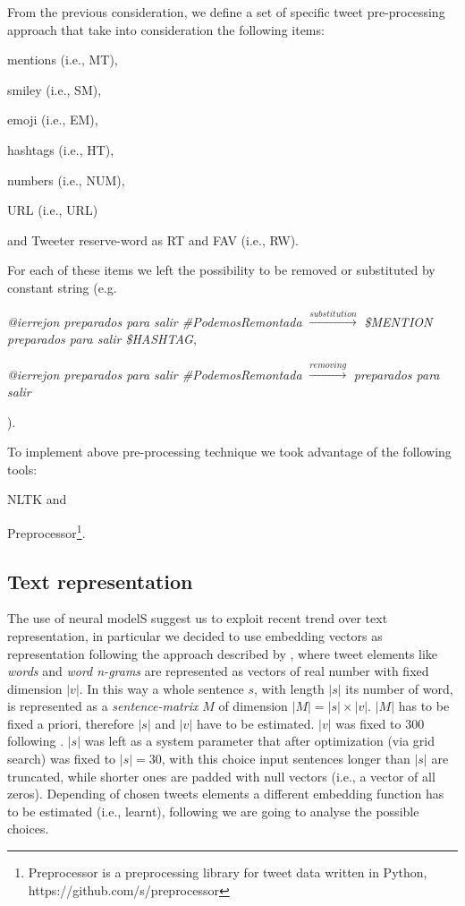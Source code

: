 From the previous consideration, we define a set of specific tweet pre-processing approach that take into consideration the following items:
\begin{enumerate*}
\item mentions (i.e., MT),
\item smiley (i.e., SM),
\item emoji (i.e., EM),
\item hashtags (i.e., HT),
\item numbers (i.e., NUM),
\item URL (i.e., URL)
\item and Tweeter reserve-word as RT and FAV (i.e., RW).
\end{enumerate*}

For each of these items we left the possibility to be removed or substituted by constant string (e.g.
\begin{enumerate*}
\item \emph{@ierrejon preparados para salir #PodemosRemontada} $\xrightarrow{substitution} $ \emph{\$MENTION preparados para salir \$HASHTAG},
\item \emph{@ierrejon preparados para salir #PodemosRemontada} $\xrightarrow{removing} $ \emph{preparados para salir}
\end{enumerate*}
).

To implement above pre-processing technique we took advantage of the following tools:
\begin{enumerate*}
\item NLTK \cite{nltk} and 
\item Preprocessor\footnote{Preprocessor is a preprocessing library for tweet data written in Python, https://github.com/s/preprocessor}.
\end{enumerate*}



\subsection{Text representation} \label{subsec:representation}
The use of neural modelS suggest us to exploit recent trend over text representation, in particular we decided to use embedding vectors as representation following the approach described by \cite{bojanowski2016enriching}, where tweet elements like \emph{words} and \emph{word n-grams} are represented as vectors of real number with fixed dimension $|v|$.
In this way a whole sentence $s$, with length $|s|$ its number of word, is represented as a \emph{sentence-matrix} $M$ of dimension $|M| = |s| \times |v|$. $|M|$ has to be fixed a priori, therefore $|s|$ and $|v|$ have to be estimated. $|v|$ was fixed to 300 following \cite{bojanowski2016enriching}. $|s|$ was left as a system parameter that after optimization (via grid search) was fixed to $|s| = 30$, with this choice 
input sentences longer than $|s|$ are truncated, while shorter ones are padded with null vectors (i.e., a vector of all zeros).
Depending of chosen tweets elements a different embedding function has to be estimated (i.e., learnt), following we are going to analyse the possible choices.

